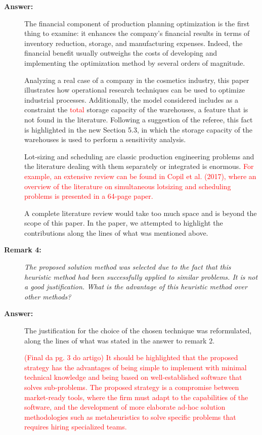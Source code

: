 \documentclass[11pt]{article}
\begin{document}
\begin{description}
\item[\textbf{Answer:}] The financial component of production planning optimization is the first thing to examine: it  enhances the company's financial results in terms of inventory reduction, storage, and manufacturing expenses. Indeed, the financial benefit usually outweighs the costs of developing and implementing the optimization method by several orders of magnitude. 

Analyzing a real case of a company in the cosmetics industry, this paper illustrates how operational research techniques can be used to optimize industrial processes. Additionally, the model considered includes as a constraint the \textcolor{red}{total} storage capacity of the warehouses, a feature that is not found in the literature. Following a suggestion of the referee, this fact is highlighted in the new Section 5.3, in which the storage capacity of the warehouses is used to perform a sensitivity analysis. 

Lot-sizing and scheduling are classic production engineering problems and the literature dealing with them separately or integrated is enormous. \textcolor{red}{For example, an extensive review can be found in Copil et al. (2017), where an overview of the literature on simultaneous lotsizing and scheduling problems is presented in a 64-page paper.}

A complete literature review would take too much space and is beyond the scope of this paper. In the paper, we attempted to highlight the contributions along the lines of what was mentioned above.


\item[\textbf{Remark 4:}] \textit{The proposed solution method was selected due to the fact that this heuristic method had been successfully applied to similar problems. It is not a good justification. What is the advantage of this heuristic method over other methods?}

\item[\textbf{Answer:}] The justification for the choice of the chosen technique was reformulated, along the lines of what was stated in the answer to remark 2.

\textcolor{red}{(Final da pg. 3 do artigo) It should be highlighted that the proposed strategy has the advantages of being simple to implement with minimal technical knowledge and being based on well-established software that solves sub-problems. The proposed strategy is a compromise between market-ready tools, where the firm must adapt to the capabilities of the software, and the development of more elaborate ad-hoc solution methodologies such as metaheuristics to solve specific problems that requires hiring specialized teams.}


\end{description}
\end{document}
